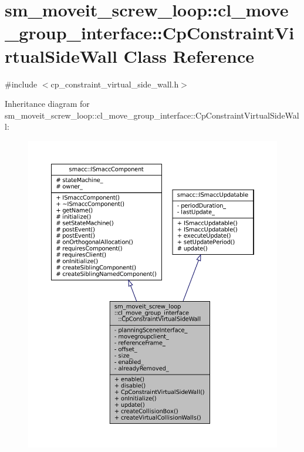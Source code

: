 \hypertarget{classsm__moveit__screw__loop_1_1cl__move__group__interface_1_1CpConstraintVirtualSideWall}{}\section{sm\+\_\+moveit\+\_\+screw\+\_\+loop\+:\+:cl\+\_\+move\+\_\+group\+\_\+interface\+:\+:Cp\+Constraint\+Virtual\+Side\+Wall Class Reference}
\label{classsm__moveit__screw__loop_1_1cl__move__group__interface_1_1CpConstraintVirtualSideWall}


{\ttfamily \#include $<$cp\+\_\+constraint\+\_\+virtual\+\_\+side\+\_\+wall.\+h$>$}



Inheritance diagram for sm\+\_\+moveit\+\_\+screw\+\_\+loop\+:\+:cl\+\_\+move\+\_\+group\+\_\+interface\+:\+:Cp\+Constraint\+Virtual\+Side\+Wall\+:
\nopagebreak
\begin{figure}[H]
\begin{center}
\leavevmode
\includegraphics[width=350pt]{classsm__moveit__screw__loop_1_1cl__move__group__interface_1_1CpConstraintVirtualSideWall__inherit__graph}
\end{center}
\end{figure}


